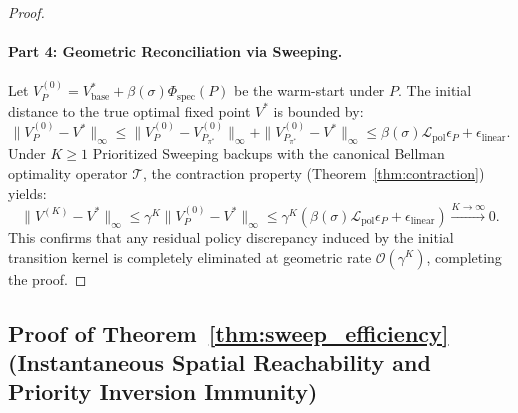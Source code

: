 \documentclass[11pt,a4paper]{article}
\begin{document}
\begin{proof}
\paragraph{Part 4: Geometric Reconciliation via Sweeping.}
Let $V_P^{(0)} = V_{\text{base}}^* + \beta(\sigma) \Phi_{\text{spec}}(P)$ be the warm-start under $P$. The initial distance to the true optimal fixed point $V^*$ is bounded by:
\begin{equation}
\|V_P^{(0)} - V^*\|_\infty \le \|V_P^{(0)} - V_{P_{\pi^*}}^{(0)}\|_\infty + \|V_{P_{\pi^*}}^{(0)} - V^*\|_\infty \le \beta(\sigma) \mathcal{L}_{\text{pol}} \epsilon_P + \epsilon_{\text{linear}}.
\end{equation}
Under $K \ge 1$ Prioritized Sweeping backups with the canonical Bellman optimality operator $\mathcal{T}$, the contraction property (Theorem~\ref{thm:contraction}) yields:
\begin{equation}
\|V^{(K)} - V^*\|_\infty \le \gamma^K \|V_P^{(0)} - V^*\|_\infty \le \gamma^K \left( \beta(\sigma) \mathcal{L}_{\text{pol}} \epsilon_P + \epsilon_{\text{linear}} \right) \xrightarrow{K \to \infty} 0.
\end{equation}
This confirms that any residual policy discrepancy induced by the initial transition kernel is completely eliminated at geometric rate $\mathcal{O}(\gamma^K)$, completing the proof.
\end{proof}

\subsection{Proof of Theorem~\ref{thm:sweep_efficiency} (Instantaneous Spatial Reachability and Priority Inversion Immunity)}
\label{subsec:proof_thm6}
\end{document}
